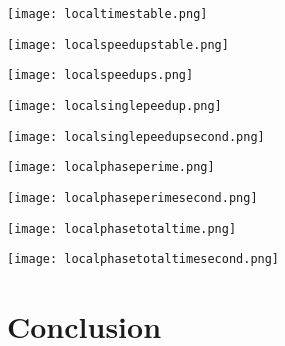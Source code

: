 \documentclass[11pt]{report}
\newcommand{\SCALE}{0.5}
\begin{document}
\begin{minipage}{\SCALE\linewidth}
\texttt{[image: localtimestable.png]}
\end{minipage}
\hfill
\begin{minipage}{\SCALE\linewidth}
\texttt{[image: localspeedupstable.png]}
\end{minipage}

\begin{minipage}{\SCALE\linewidth}
\texttt{[image: localspeedups.png]}
\end{minipage}
\hfill
\begin{minipage}{\SCALE\linewidth}
\texttt{[image: localsinglepeedup.png]}
\end{minipage}

\begin{minipage}{\SCALE\linewidth}
\texttt{[image: localsinglepeedupsecond.png]}
\end{minipage}

\begin{minipage}{\SCALE\linewidth}
\texttt{[image: localphaseperime.png]}
\end{minipage}
\hfill
\begin{minipage}{\SCALE\linewidth}
\texttt{[image: localphaseperimesecond.png]}
\end{minipage}

\begin{minipage}{\SCALE\linewidth}
\texttt{[image: localphasetotaltime.png]}
\end{minipage}
\hfill
\begin{minipage}{\SCALE\linewidth}
\texttt{[image: localphasetotaltimesecond.png]}
\end{minipage}

\section*{Conclusion}
\end{document}
